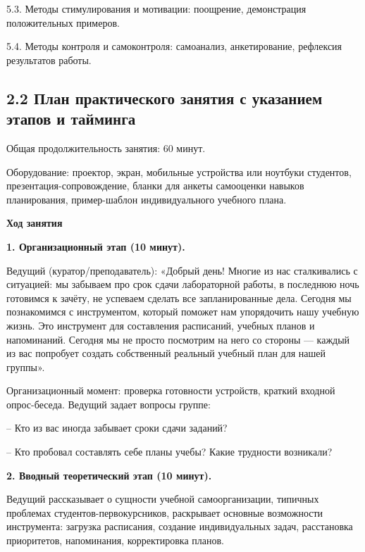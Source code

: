 \documentclass[
]{article}
\begin{document}
5.3. Методы стимулирования и мотивации: поощрение, демонстрация
положительных примеров.

5.4. Методы контроля и самоконтроля: самоанализ, анкетирование,
рефлексия результатов работы.

\subsection{\texorpdfstring{\textbf{2.2 План практического занятия с
указанием этапов и
тайминга}}{2.2 План практического занятия с указанием этапов и тайминга}}\label{ux43fux43bux430ux43d-ux43fux440ux430ux43aux442ux438ux447ux435ux441ux43aux43eux433ux43e-ux437ux430ux43dux44fux442ux438ux44f-ux441-ux443ux43aux430ux437ux430ux43dux438ux435ux43c-ux44dux442ux430ux43fux43eux432-ux438-ux442ux430ux439ux43cux438ux43dux433ux430}

Общая продолжительность занятия: 60 минут.

Оборудование: проектор, экран, мобильные устройства или ноутбуки
студентов, презентация-сопровождение, бланки для анкеты самооценки
навыков планирования, пример-шаблон индивидуального учебного плана.

\textbf{Ход занятия}

\textbf{1. Организационный этап (10 минут).}

Ведущий (куратор/преподаватель): «Добрый день! Многие из нас
сталкивались с ситуацией: мы забываем про срок сдачи лабораторной
работы, в последнюю ночь готовимся к зачёту, не успеваем сделать все
запланированные дела. Сегодня мы познакомимся с инструментом, который
поможет нам упорядочить нашу учебную жизнь. Это инструмент для
составления расписаний, учебных планов и напоминаний. Сегодня мы не
просто посмотрим на него со стороны --- каждый из вас попробует создать
собственный реальный учебный план для нашей группы».

Организационный момент: проверка готовности устройств, краткий входной
опрос-беседа. Ведущий задает вопросы группе:

-- Кто из вас иногда забывает сроки сдачи заданий?

-- Кто пробовал составлять себе планы учебы? Какие трудности возникали?

\textbf{2. Вводный теоретический этап (10 минут).}

Ведущий рассказывает о сущности учебной самоорганизации, типичных
проблемах студентов-первокурсников, раскрывает основные возможности
инструмента: загрузка расписания, создание индивидуальных задач,
расстановка приоритетов, напоминания, корректировка планов.
\end{document}

